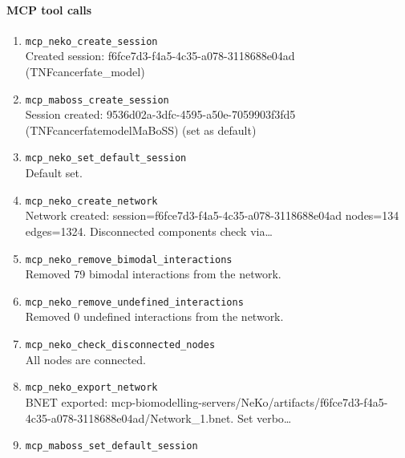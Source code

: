 \paragraph{MCP tool calls}
\begingroup
\small
\setlength{\itemsep}{5pt}
\setlength{\parskip}{0pt}
\begin{enumerate}
\item[1.] \texttt{mcp\_\allowbreak{}neko\_\allowbreak{}create\_\allowbreak{}session}
\hfill\\
\RaggedRight Created session: f6fce7d3-f4a5-4c35-a078-3118688e04ad (TNFcancerfate\_model)
\item[2.] \texttt{mcp\_\allowbreak{}maboss\_\allowbreak{}create\_\allowbreak{}session}
\hfill\\
\RaggedRight Session created: 9536d02a-3dfc-4595-a50e-7059903f3fd5 (TNFcancerfatemodelMaBoSS) (set as default)
\item[3.] \texttt{mcp\_\allowbreak{}neko\_\allowbreak{}set\_\allowbreak{}default\_\allowbreak{}session}
\hfill\\
\RaggedRight Default set.
\item[4.] \texttt{mcp\_\allowbreak{}neko\_\allowbreak{}create\_\allowbreak{}network}
\hfill\\
\RaggedRight Network created: session=f6fce7d3-f4a5-4c35-a078-3118688e04ad nodes=134 edges=1324. Disconnected components check via\ldots{}
\item[5.] \texttt{mcp\_\allowbreak{}neko\_\allowbreak{}remove\_\allowbreak{}bimodal\_\allowbreak{}interactions}
\hfill\\
\RaggedRight Removed 79 bimodal interactions from the network.
\item[6.] \texttt{mcp\_\allowbreak{}neko\_\allowbreak{}remove\_\allowbreak{}undefined\_\allowbreak{}interactions}
\hfill\\
\RaggedRight Removed 0 undefined interactions from the network.
\item[7.] \texttt{mcp\_\allowbreak{}neko\_\allowbreak{}check\_\allowbreak{}disconnected\_\allowbreak{}nodes}
\hfill\\
\RaggedRight All nodes are connected.
\item[8.] \texttt{mcp\_\allowbreak{}neko\_\allowbreak{}export\_\allowbreak{}network}
\hfill\\
\RaggedRight BNET exported: mcp-biomodelling-servers/NeKo/artifacts/f6fce7d3-f4a5-4c35-a078-3118688e04ad/Network\_1.bnet. Set verbo\ldots{}
\item[9.] \texttt{mcp\_\allowbreak{}maboss\_\allowbreak{}set\_\allowbreak{}default\_\allowbreak{}session}

\end{enumerate}
